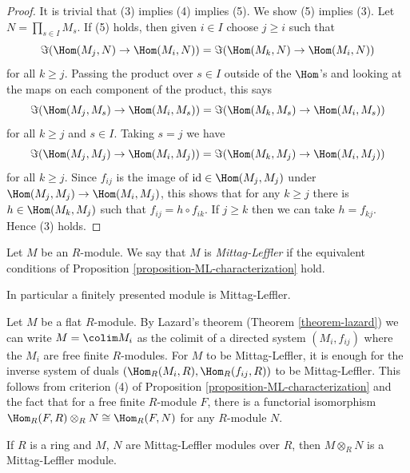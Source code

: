\begin{proof}
\medskip\noindent
It is trivial that (3) implies (4) implies (5).  We show (5) implies (3).  Let
$N = \prod_{s \in I} M_s$. If (5) holds, then given $i \in I$ choose $j \geq i$
such that
$$
\Im( \Hom(M_j, N) \to  \Hom(M_i, N)) =
\Im( \Hom(M_k, N) \to  \Hom(M_i, N))
$$
for all $k \geq j$.  Passing the product over $s \in I$ outside of the
$\Hom$'s
and looking at the maps on each component of the product, this says
$$
\Im( \Hom(M_j, M_s) \to  \Hom(M_i, M_s)) =
\Im( \Hom(M_k, M_s) \to   \Hom(M_i, M_s))
$$
for all $k \geq j$ and $s \in I$.  Taking $s = j$ we have
$$
\Im( \Hom(M_j, M_j) \to  \Hom(M_i, M_j)) =
\Im( \Hom(M_k, M_j) \to   \Hom(M_i, M_j))
$$
for all $k \geq j$.  Since $f_{ij}$ is the image of
$\text{id} \in  \Hom(M_j, M_j)$ under
$\Hom(M_j, M_j) \to  \Hom(M_i, M_j)$,
this shows  that for any $k \geq j$ there is $h \in \Hom(M_k, M_j)$
such that $f_{ij} = h \circ f_{ik}$.  If $j \geq k$ then we can take
$h = f_{kj}$. Hence (3) holds.
\end{proof}

\begin{definition}
\label{definition-mittag-leffler-module}
Let $M$ be an $R$-module.  We say that $M$ is {\it Mittag-Leffler} if the
equivalent conditions of
Proposition \ref{proposition-ML-characterization}
hold.
\end{definition}

\noindent
In particular a finitely presented module is Mittag-Leffler.

\begin{remark}
\label{remark-flat-ML}
Let $M$ be a flat $R$-module. By Lazard's theorem
(Theorem \ref{theorem-lazard})
we can write $M = \colim M_i$ as the colimit of a
directed system $(M_i, f_{ij})$ where the $M_i$ are free
finite $R$-modules. For $M$ to be Mittag-Leffler, it is enough for the inverse
system of duals $(\Hom_R(M_i, R), \Hom_R(f_{ij}, R))$ to be
Mittag-Leffler. This follows from criterion (4) of
Proposition \ref{proposition-ML-characterization}
and the fact that for a free finite $R$-module $F$,
there is a functorial isomorphism
$\Hom_R(F, R) \otimes_R N \cong \Hom_R(F, N)$
for any $R$-module $N$.
\end{remark}

\begin{lemma}
\label{lemma-tensor-ML-modules}
If $R$ is a ring and $M$, $N$ are Mittag-Leffler modules over $R$,
then $M \otimes_R N$ is a Mittag-Leffler module.
\end{lemma}

